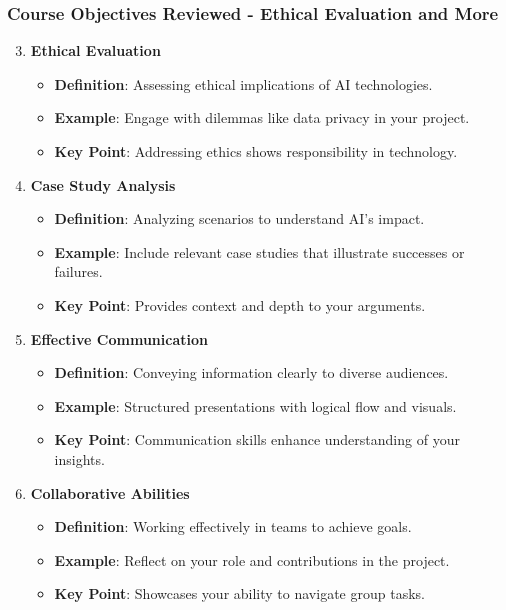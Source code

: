 \documentclass[aspectratio=169]{beamer}
\begin{document}
\begin{frame}[fragile]
    \frametitle{Course Objectives Reviewed - Ethical Evaluation and More}
    \begin{enumerate}
        \setcounter{enumi}{2} %
        \item \textbf{Ethical Evaluation}
            \begin{itemize}
                \item \textbf{Definition}: Assessing ethical implications of AI technologies.
                \item \textbf{Example}: Engage with dilemmas like data privacy in your project.
                \item \textbf{Key Point}: Addressing ethics shows responsibility in technology.
            \end{itemize}
        
        \item \textbf{Case Study Analysis}
            \begin{itemize}
                \item \textbf{Definition}: Analyzing scenarios to understand AI's impact.
                \item \textbf{Example}: Include relevant case studies that illustrate successes or failures.
                \item \textbf{Key Point}: Provides context and depth to your arguments.
            \end{itemize}

        \item \textbf{Effective Communication}
            \begin{itemize}
                \item \textbf{Definition}: Conveying information clearly to diverse audiences.
                \item \textbf{Example}: Structured presentations with logical flow and visuals.
                \item \textbf{Key Point}: Communication skills enhance understanding of your insights.
            \end{itemize}
        
        \item \textbf{Collaborative Abilities}
            \begin{itemize}
                \item \textbf{Definition}: Working effectively in teams to achieve goals.
                \item \textbf{Example}: Reflect on your role and contributions in the project.
                \item \textbf{Key Point}: Showcases your ability to navigate group tasks.
            \end{itemize}
    \end{enumerate}
\end{frame}
\end{document}
